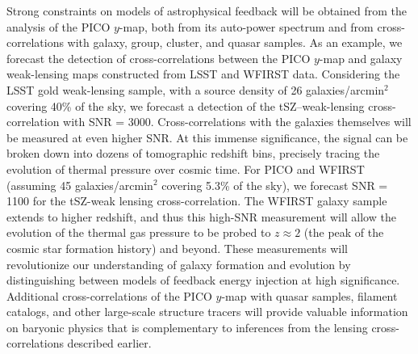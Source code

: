 \documentclass[PICOAPC.tex]{subfiles}
\begin{document}
Strong constraints on models of astrophysical feedback will be obtained from the analysis of the PICO $y$-map, both from its auto-power spectrum and from cross-correlations with galaxy, group, cluster, and quasar samples. 
As an example, we forecast the detection of cross-correlations between the PICO $y$-map and galaxy weak-lensing maps constructed from LSST and WFIRST data.  Considering the LSST gold weak-lensing sample, with a source density of 26 galaxies/arcmin${}^2$ covering 40\% of the sky, we forecast a detection of the tSZ--weak-lensing cross-correlation with \ac{SNR} = 3000.  Cross-correlations with the galaxies themselves will be measured at even higher \ac{SNR}.  At this immense significance, the signal can be broken down into dozens of tomographic redshift bins, precisely tracing the evolution of thermal pressure over cosmic time.  For PICO and WFIRST (assuming 45 galaxies/arcmin${}^2$ covering 5.3\% of the sky), we forecast \ac{SNR} = 1100 for the tSZ-weak lensing cross-correlation.  The WFIRST galaxy sample extends to higher redshift, and thus this high-\ac{SNR} measurement will allow the evolution of the thermal gas pressure to be probed to $z \approx 2$ (the peak of the cosmic star formation history) and beyond.  These measurements will revolutionize our understanding of galaxy formation and evolution by distinguishing between models of feedback energy injection at high significance.  Additional cross-correlations of the PICO $y$-map with quasar samples, filament catalogs, and other large-scale structure tracers will provide valuable information on baryonic physics that is complementary to inferences from the lensing cross-correlations described earlier.  
\end{document}
